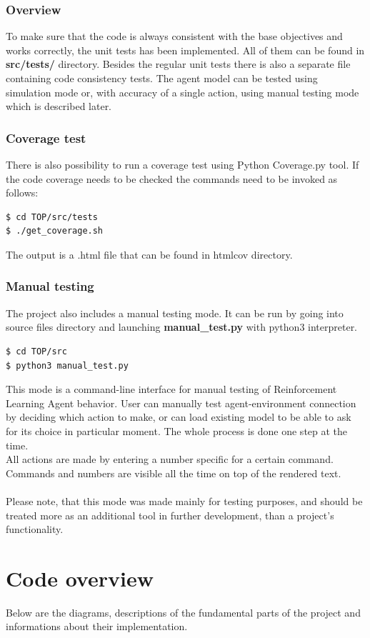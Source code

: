 \documentclass{article}
\begin{document}
\subsubsection{Overview}
To make sure that the code is always consistent with the base objectives and works correctly, the unit tests has been implemented. All of them can be found in \textbf{src/tests/} directory. Besides the regular unit tests there is also a separate file containing code consistency tests.
	The agent model can be tested using simulation mode or, with accuracy of a single action, using manual testing mode which is described later.

\subsubsection{Coverage test}
There is also possibility to run a coverage test using Python Coverage.py tool. If the code coverage needs to be checked the commands need to be invoked as follows:
\begin{lstlisting}
$ cd TOP/src/tests
$ ./get_coverage.sh
\end{lstlisting}
The output is a .html file that can be found in htmlcov directory.

\subsubsection{Manual testing}
The project also includes a manual testing mode. It can be run by going into source files directory and launching \textbf{manual\_test.py} with python3 interpreter. 
\begin{lstlisting}
$ cd TOP/src
$ python3 manual_test.py
\end{lstlisting}
This mode is a command-line interface for manual testing of Reinforcement Learning Agent behavior. User can manually test agent-environment connection by deciding which action to make, or can load existing model to be able to ask for its choice in particular moment. The whole process is done one step at the time.\\
All actions are made by entering a number specific for a certain command. Commands and numbers are visible all the time on top of the rendered text. \\\\
Please note, that this mode was made mainly for testing purposes, and should be treated more as an additional tool in further development, than a project's functionality.
\newpage
\section{Code overview}
Below are the diagrams, descriptions of the fundamental parts of the project and informations about their implementation. 
\end{document}
